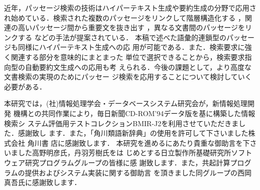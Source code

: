 近年，パッセージ検索の技術はハイパーテキスト生成や要約生成の分野で応用さ
れ始めている．検索された複数のパッセージをリンクして階層構造化する
\cite{Salton:94b}，関連の高いパッセージ間から重要文を抜き出す
\cite{Salton:94b}，異なる文書間のパッセージをリンクする
\cite{Dalamagas:98}などの手法が提案されている．
本稿で述べた語彙的連鎖型のパッセージも同様にハイパーテキスト生成への応
用が可能である．また．検索要求に強く関連する部分を意味的にまとまった
単位で選択できることから，検索要求指向型の自動要約文生成への応用も考
えられる．今後の課題として，より高度な文書検索の実現のためにパッセー
ジ検索を応用することについて検討していく必要がある．


\vspace{4mm}
\acknowledgment
本研究では，(社)情報処理学会・データベースシステム研究会が，新情報処理開発
機構との共同作業により，毎日新聞CD-ROM'94データ版を基に構築した情報検索シ
ステム評価用テストコレクションBMIR-J2を利用させていただきました．感謝致し
ます．また，「角川類語新辞典」の使用を許可して下さいました株式会社 角川書
店に感謝致します．
本研究を進めるにあたり貴重な御助言を下さいました高野明彦氏，丹羽芳樹氏をは
じめとする日立製作所基礎研究所ソフトウェア研究プログラムグループの皆様に感
謝致します．また，共起計算プログラムの提供およびシステム実装に関する御助言
を頂きました同グループの西岡真吾氏に感謝致します．




\begin{biography}


\end{biography}


